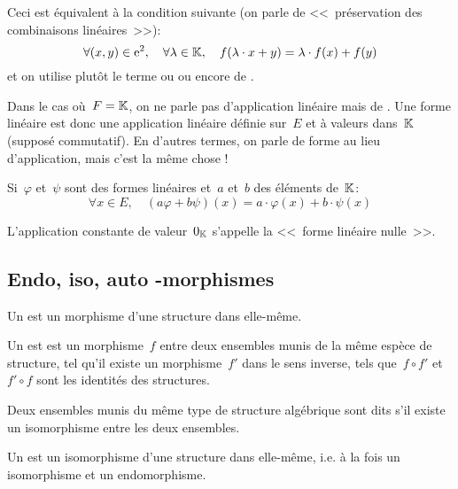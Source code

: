Ceci est équivalent à la condition suivante (on parle de <<~préservation des combinaisons
linéaires~>>):
\begin{equation}\colorred
\forall (x,y)\in \mathrm{e}^2,\quad \forall \lambda\in\KK,\quad f(\lambda\cdot x+ y)=\lambda \cdot f(x) + f(y)
\end{equation}
et on utilise plutôt le terme  ou  ou encore de .

\medskip
Dans le cas où~$F=\mathbb K$, on ne parle pas d'application linéaire mais de .
Une forme linéaire est donc une application linéaire définie sur~$E$ et à valeurs dans~$\mathbb K$ (supposé
commutatif).
En d'autres termes, on parle de forme au lieu d'application, mais c'est la même chose !

\medskip
Si~$\varphi$ et~$\psi$ sont des formes linéaires et~$a$ et~$b$ des éléments de~$\mathbb K$:
\begin{equation}
  \forall x \in E,\quad (a\varphi + b\psi)(x) = a\cdot \varphi(x) + b\cdot \psi(x)
\end{equation}

\medskip
L'application constante de valeur~$0_{\mathbb K}$ s'appelle la <<~forme linéaire nulle~>>.

\medskip
\subsection{Endo, iso, auto -morphismes}

Un  est un morphisme d'une structure dans elle-même.

\medskip
Un  est est un morphisme~$f$ entre deux ensembles munis
de la même espèce de structure, tel qu'il existe un morphisme~$f'$ dans le sens inverse,
tels que~$f\circ f'$ et~$f'\circ f$ sont les identités des structures.

Deux ensembles munis du même type de structure algébrique sont dits 
s'il existe un isomorphisme entre les deux ensembles.


\medskip
Un  est un isomorphisme d'une structure dans elle-même,
i.e. à la fois un isomorphisme et un endomorphisme.

